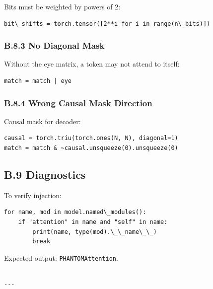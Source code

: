 Bits must be weighted by powers of 2:

\begin{lstlisting}
bit\_shifts = torch.tensor([2**i for i in range(n\_bits)])
\end{lstlisting}

\subsubsection{B.8.3 No Diagonal Mask}

Without the eye matrix, a token may not attend to itself:

\begin{lstlisting}
match = match | eye
\end{lstlisting}

\subsubsection{B.8.4 Wrong Causal Mask Direction}

Causal mask for decoder:

\begin{lstlisting}
causal = torch.triu(torch.ones(N, N), diagonal=1)
match = match & ~causal.unsqueeze(0).unsqueeze(0)
\end{lstlisting}

\subsection{B.9 Diagnostics}

To verify injection:

\begin{lstlisting}
for name, mod in model.named\_modules():
    if "attention" in name and "self" in name:
        print(name, type(mod).\_\_name\_\_)
        break
\end{lstlisting}

Expected output: \texttt{PHANTOMAttention}.
\begin{lstlisting}

---
\end{lstlisting}